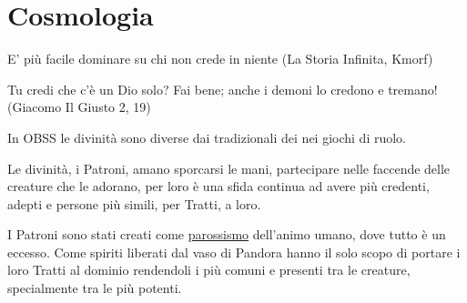 \section{Cosmologia}\hypertarget{cosmologia}{}\label{cosmologia}

\begin{enfasi}{
E' più facile dominare su chi non crede in niente (La Storia Infinita, Kmorf)

\medskip

Tu credi che c'è un Dio solo? Fai bene; anche i demoni lo credono e tremano! (Giacomo Il Giusto 2, 19)}\end{enfasi}

\begin{narratore}[I Patroni]

In OBSS le divinità sono diverse dai tradizionali dei nei giochi di ruolo.

Le divinità, i Patroni, amano sporcarsi le mani, partecipare nelle faccende delle creature che le adorano, per loro è una sfida continua ad avere più credenti, adepti e persone più simili, per Tratti, a loro.

I Patroni sono stati creati come \href{https://www.treccani.it/vocabolario/parossismo/}{parossismo} dell'animo umano, dove tutto è un eccesso. Come spiriti liberati dal vaso di Pandora hanno il solo scopo di portare i loro Tratti al dominio rendendoli i più comuni e presenti tra le creature, specialmente tra le più potenti.
\end{narratore}

\medskip

